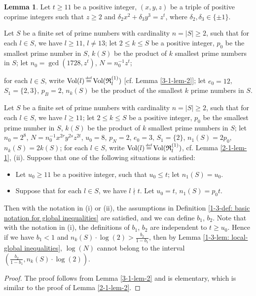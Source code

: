 \documentclass[a4paper, 12pt]{article}
\DeclareMathOperator{\defeq}{\overset{\text{\tiny{def}}}{=}}
\DeclareMathOperator{\Vol}{\text{Vol}}
\numberwithin{equation}{section}
\theoremstyle{definition}
\newtheorem{lem}[thm]{Lemma}
\begin{document}
\begin{lem}  \label{3-1-lem-3}
Let $t\ge 11$ be a positive integer, $(x,y,z)$ be a triple of positive coprime integers such that $z\ge 2$ and $\delta_2 x^2 + \delta_3 y^3 = z^t$, where $\delta_2,\delta_3 \in \{\pm 1\}$.

Let $S$ be a finite set of prime numbers with cardinality $n = |S| \ge 2$, such that for each $l\in S$, we have $l \ge 11$, $l\neq 13$;
let $2\le k\le S$ be a positive integer, $p_0$ be the smallest prime number in $S$, $k(S)$ be the product of $k$ smallest prime numbers in $S$;
let $n_0 = \gcd(1728, z^t)$, $N = n_0^{-1} z^t$;

for each $l\in S$, write $\Vol(l)\defeq \Vol(\mathfrak R_l^{(1)})$ [cf. Lemma \ref{3-1-lem-2}]; let $e_0 = 12$, $S_1 = \{2,3\}$,  $p_B = 2$, $n_k(S)$ be the product of the smallest $k$ prime numbers in $S$.

Let $S$ be a finite set of prime numbers with cardinality $n = |S| \ge 2$, such that for each $l\in S$, we have $l \ge 11$;
let $2\le k\le S$ be a positive integer, $p_0$ be the smallest prime number in $S$, $k(S)$ be the product of $k$ smallest prime numbers in $S$;
let $n_0 = 2^8$, $N = n_0^{-1}x^{2r}y^{2s}z^{2t}$, $u_0 = 8$, $p_N = 2$, $e_0 = 3$,  $S_1 = \{2\}$, $n_1(S) = 2 p_0$, $n_k(S) = 2 k(S)$;
for each $l\in S$, write $\Vol(l) \defeq \Vol(\mathfrak R_l^{(1)})$, cf. Lemma \ref{2-1-lem-1}, (ii).
Suppose that one of the following situations is satisfied:


\begin{itemize}
\item[(i)] Let $u_0 \ge 11$ be a positive integer, such that $u_0\le t$;
let $n_1(S) = u_0$.

\item[(ii)] Suppose that for each $l\in S$, we have $l\nmid t$.
Let $u_0 = t$, $n_1(S) = p_0 t$.
\end{itemize}

Then with the notation in (i) or (ii), the assumptions in Definition \ref{1-3-def: basic notation for global inequalities} are satisfied, and we can define $b_1$, $b_2$.
Note that with the notation in (i), the definitions of $b_1$, $b_2$ are independent to $t\ge u_0$.
Hence if we have $b_1 <  1$ and $n_k(S)\cdot \log(2) > \frac{b_2}{1-b_1}$, then by Lemma \ref{1-3-lem: local-global inequalities}, $\log(N)$ cannot belong to the interval $(\frac{b_2}{1-b_1}, n_k(S)\cdot \log(2) ) .$
\end{lem}
\begin{proof}
The proof follows from Lemma \ref{3-1-lem-2} and is elementary, which is similar to the proof of Lemma \ref{2-1-lem-2}.
\end{proof}
\end{document}

